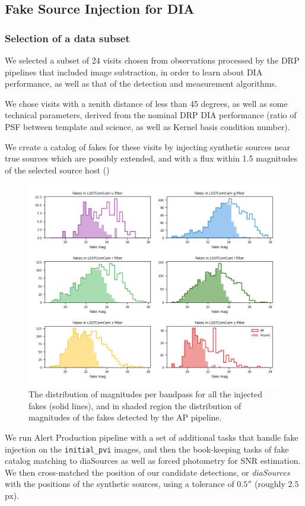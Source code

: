 \subsection{Fake Source Injection for DIA}
\subsubsection{Selection of a data subset}

We selected a subset of 24 visits chosen from observations processed by the DRP pipelines that included image
subtraction, in order to learn about DIA performance, as well as that of the detection and measurement
algorithms.

We chose visits with a zenith distance of less than 45 degrees, as well as some technical parameters, derived from the nominal DRP DIA performance (ratio of PSF between template and science, as well as Kernel basis condition number). 

We create a catalog of fakes for these visits by injecting synthetic sources near true sources which are
possibly extended, and with a flux within 1.5 magnitudes of the selected source host
()

\begin{figure}
    \centering
    \includegraphics[width=0.5\linewidth]{dia/figures/simple_hist_completeness_mag_per_filter.png}
    \caption{The distribution of magnitudes per bandpass for all the injected fakes (solid lines), and in shaded region the distribution of magnitudes of the fakes detected by the AP pipeline.}
    \label{fig:found_fakes_per_Filter}
\end{figure}


We run Alert Production pipeline with a set of additional tasks that handle fake injection on the
\texttt{initial\_pvi} images, and then the book-keeping tasks of fake catalog matching to diaSources as well
as forced photometry for SNR estimation. We then cross-matched the position of our candidate detections, or
\textit{diaSources} with the positions of the synthetic sources, using a tolerance of $0.5''$ (roughly
$2.5$px).

